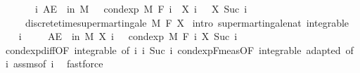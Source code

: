 \begin{isabellebody}
\ \ \ \ \ \ \ {\isachardoublequoteopen}{\isasymAnd}i{\isachardot}{\kern0pt}\ AE\ {\isasymxi}\ in\ M{\isachardot}{\kern0pt}\ {}\ {\isasymle}\ cond{\isacharunderscore}{\kern0pt}exp\ M\ {\isacharparenleft}{\kern0pt}F\ i{\isacharparenright}{\kern0pt}\ {\isacharparenleft}{\kern0pt}{\isasymlambda}{\isasymxi}{\isachardot}{\kern0pt}\ X\ i\ {\isasymxi}\ {\isacharminus}{\kern0pt}\ X\ {\isacharparenleft}{\kern0pt}Suc\ i{\isacharparenright}{\kern0pt}\ {\isasymxi}{\isacharparenright}{\kern0pt}\ {\isasymxi}{\isachardoublequoteclose}\ \isanewline
\ \ \ \ \ {\isachardoublequoteopen}discrete{\isacharunderscore}{\kern0pt}time{\isacharunderscore}{\kern0pt}supermartingale\ M\ F\ X{\isachardoublequoteclose}\isanewline
%
\isadelimproof
%
\endisadelimproof
%
\isatagproof
{}\isamarkupfalse%
\ {\isacharparenleft}{\kern0pt}intro\ supermartingale{\isacharunderscore}{\kern0pt}nat\ integrable{\isacharparenright}{\kern0pt}\ \isanewline
\ \ \isamarkupfalse%
\ i\ \isanewline
\ \ \isamarkupfalse%
\ {\isachardoublequoteopen}AE\ {\isasymxi}\ in\ M{\isachardot}{\kern0pt}\ X\ i\ {\isasymxi}\ {\isasymge}\ cond{\isacharunderscore}{\kern0pt}exp\ M\ {\isacharparenleft}{\kern0pt}F\ i{\isacharparenright}{\kern0pt}\ {\isacharparenleft}{\kern0pt}X\ {\isacharparenleft}{\kern0pt}Suc\ i{\isacharparenright}{\kern0pt}{\isacharparenright}{\kern0pt}\ {\isasymxi}{\isachardoublequoteclose}\ \isamarkupfalse%
\ cond{\isacharunderscore}{\kern0pt}exp{\isacharunderscore}{\kern0pt}diff{\isacharbrackleft}{\kern0pt}OF\ integrable{\isacharparenleft}{\kern0pt}{}{\isacharcomma}{\kern0pt}{}{\isacharparenright}{\kern0pt}{\isacharcomma}{\kern0pt}\ of\ i\ i\ {\isachardoublequoteopen}Suc\ i{\isachardoublequoteclose}{\isacharbrackright}{\kern0pt}\ cond{\isacharunderscore}{\kern0pt}exp{\isacharunderscore}{\kern0pt}F{\isacharunderscore}{\kern0pt}meas{\isacharbrackleft}{\kern0pt}OF\ integrable\ adapted{\isacharcomma}{\kern0pt}\ of\ i{\isacharbrackright}{\kern0pt}\ assms{\isacharparenleft}{\kern0pt}{}{\isacharparenright}{\kern0pt}{\isacharbrackleft}{\kern0pt}of\ i{\isacharbrackright}{\kern0pt}\ \isamarkupfalse%
\ fastforce\isanewline
{}\isamarkupfalse%
%
\endisatagproof
{\isafoldproof}%
%
\isadelimproof
\isanewline
%
\endisadelimproof
%
\isadelimtheory
\isanewline
%
\endisadelimtheory
%
\isatagtheory
{}\isamarkupfalse%
%
\endisatagtheory
{\isafoldtheory}%
%
\isadelimtheory
%
\endisadelimtheory
%
\end{isabellebody}%
